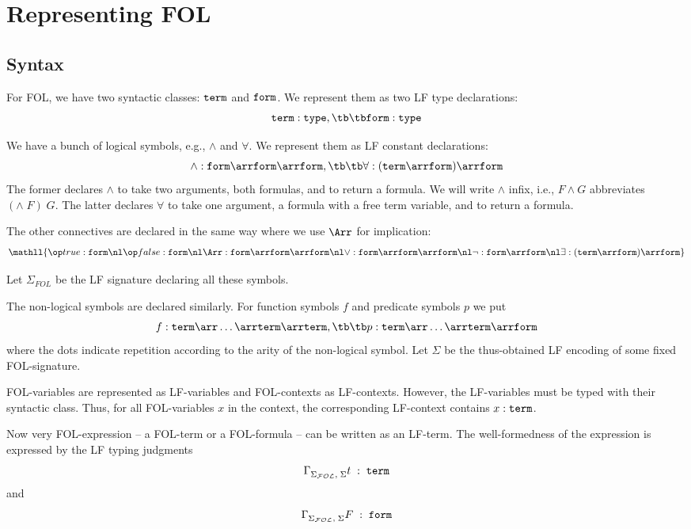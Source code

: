 \section{Representing FOL}

\subsection{Syntax}

For FOL, we have two syntactic classes: $\mathtt{term}$ and $\mathtt{form}$. We represent them as two LF type declarations:
\[\TERM :\TYPE,\tb\tb \FORM : \TYPE\]

We have a bunch of logical symbols, e.g., $\wedge$ and $\forall$. We represent them as LF constant declarations:
\[\wedge : \FORM \arr \FORM \arr \FORM, \tb\tb \forall : (\TERM\arr\FORM)\arr \FORM\]
The former declares $\wedge$ to take two arguments, both formulas, and to return a formula. We will write $\wedge$ infix, i.e., $F\wedge G$ abbreviates $(\wedge\;F)\;G$. The latter declares $\forall$ to take one argument, a formula with a free term variable, and to return a formula.

The other connectives are declared in the same way where we use $\impl$ for implication:
\[\mathll{
 \true : \FORM \nl
 \false : \FORM \nl
 \impl : \FORM \arr \FORM \arr \FORM \nl
 \vee : \FORM \arr \FORM \arr \FORM \nl
 \neg : \FORM \arr \FORM \nl
 \exists : (\TERM\arr\FORM)\arr \FORM
}\]

Let $\Sigma_{FOL}$ be the LF signature declaring all these symbols.

The non-logical symbols are declared similarly. For function symbols $f$ and predicate symbols $p$ we put
\[f : \TERM\arr\ldots\arr\TERM\arr\TERM, \tb\tb p : \TERM\arr\ldots\arr\TERM\arr\FORM\]
where the dots indicate repetition according to the arity of the non-logical symbol.
Let $\Sigma$ be the thus-obtained LF encoding of some fixed FOL-signature.

FOL-variables are represented as LF-variables and FOL-contexts as LF-contexts. However, the LF-variables must be typed with their syntactic class. Thus, for all FOL-variables $x$ in the context, the corresponding LF-context contains $x:\mathtt{term}$.

Now very FOL-expression -- a FOL-term or a FOL-formula -- can be written as an LF-term. The well-formedness of the  expression is expressed by the LF typing judgments
\[\Gamma^{}_{\Sigma_{{\mathcal{FOL}}},\;\Sigma}t\;:\;\mathtt{term}\]
and
\[\Gamma^{}_{\Sigma_{{\mathcal{FOL}}},\;\Sigma}F\;:\;\mathtt{form}\]

